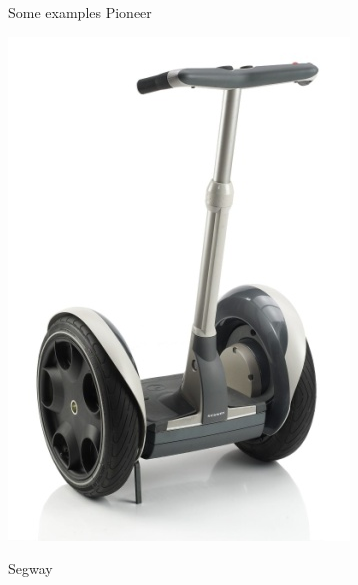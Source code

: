 \documentclass[compress]{beamer}
\begin{document}
\begin{frame}{Some examples}
Pioneer

    \begin{center}
        \includegraphics[width=0.8\linewidth]{differentialdrive_ex3}
    \end{center}

Segway

\end{frame}
\end{document}
